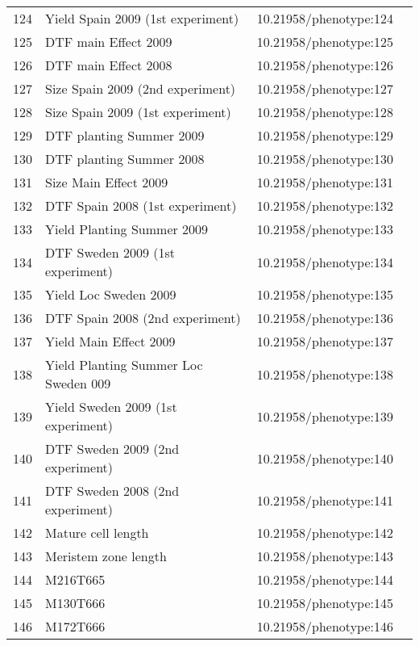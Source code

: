 \begin{longtable}{p{} p{} p{} p{}}
 124 & Yield Spain 2009 (1st experiment) & 10.21958/phenotype:124 & \cite{li2010}\\
 125 & DTF main Effect 2009 & 10.21958/phenotype:125 & \cite{li2010}\\
 126 & DTF main Effect 2008 & 10.21958/phenotype:126 & \cite{li2010}\\
 127 & Size Spain 2009 (2nd experiment) & 10.21958/phenotype:127 & \cite{li2010}\\
 128 & Size Spain 2009 (1st experiment) & 10.21958/phenotype:128 & \cite{li2010}\\
 129 & DTF planting Summer 2009 & 10.21958/phenotype:129 & \cite{li2010}\\
 130 & DTF planting Summer 2008 & 10.21958/phenotype:130 & \cite{li2010}\\
 131 & Size Main Effect 2009 & 10.21958/phenotype:131 & \cite{li2010}\\
 132 & DTF Spain 2008 (1st experiment) & 10.21958/phenotype:132 & \cite{li2010}\\
 133 & Yield Planting Summer 2009 & 10.21958/phenotype:133 & \cite{li2010}\\
 134 & DTF Sweden 2009 (1st experiment) & 10.21958/phenotype:134 & \cite{li2010}\\
 135 & Yield Loc Sweden 2009 & 10.21958/phenotype:135 & \cite{li2010}\\
 136 & DTF Spain 2008 (2nd experiment) & 10.21958/phenotype:136 & \cite{li2010}\\
 137 & Yield Main Effect 2009 & 10.21958/phenotype:137 & \cite{li2010}\\
 138 & Yield Planting Summer Loc Sweden 009 & 10.21958/phenotype:138 & \cite{li2010}\\
 139 & Yield Sweden 2009 (1st experiment) & 10.21958/phenotype:139 & \cite{li2010}\\
 140 & DTF Sweden 2009 (2nd experiment) & 10.21958/phenotype:140 & \cite{li2010}\\
 141 & DTF Sweden 2008 (2nd experiment) & 10.21958/phenotype:141 & \cite{li2010}\\
 142 & Mature cell length & 10.21958/phenotype:142 & \cite{me2014}\\
 143 & Meristem zone length & 10.21958/phenotype:143 & \cite{me2014}\\
 144 & M216T665 & 10.21958/phenotype:144 & \cite{strauch2015}\\
 145 & M130T666 & 10.21958/phenotype:145 & \cite{strauch2015}\\
 146 & M172T666 & 10.21958/phenotype:146 & \cite{strauch2015}\\

\end{longtable}
